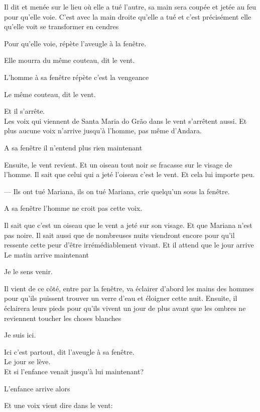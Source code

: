 Il dit et menée sur le lieu où elle a tué l'autre, sa main sera coupée
et jetée au feu pour qu'elle voie. C'est avec la main droite qu'elle a
tué et c'est précisément elle qu'elle voit se transformer en cendres

Pour qu'elle voie, répète l'aveugle à la fenêtre.

Elle mourra du même couteau, dit le vent.

L'homme à sa fenêtre répète c'est la vengeance

Le même couteau, dit le vent.

Et il s'arrête.\\

Les voix qui viennent de Santa Maria do Grão dans le vent s'arrêtent
aussi. Et plus aucune voix n'arrive jusqu'à l'homme, pas même d'Andara.

A sa fenêtre il n'entend plus rien maintenant

Ensuite, le vent revient. Et un oiseau tout noir se fracasse sur le
visage de l'homme. Il sait que celui qui a jeté l'oiseau c'est le vent.
Et cela lui importe peu.

--- Ils ont tué Mariana, ils on tué Mariana, crie quelqu'un sous la
fenêtre.

A sa fenêtre l'homme ne croit pas cette voix.

Il sait que c'est un oiseau que le vent a jeté sur son visage. Et que
Mariana n'est pas noire. Il sait aussi que de nombreuses nuits viendront
encore pour qu'il ressente cette peur d'être irrémédiablement vivant. Et
il attend que le jour arrive\\

Le matin arrive maintenant

Je le sens venir.

Il vient de ce côté, entre par la fenêtre, va éclairer d'abord les mains
des hommes pour qu'ils puissent trouver un verre d'eau et éloigner cette
nuit. Ensuite, il éclairera leurs pieds pour qu'ils vivent un jour de
plus avant que les ombres ne reviennent toucher les choses blanches

Je suis ici.

Ici c'est partout, dit l'aveugle à sa fenêtre.\\

Le jour se lève.\\

Et si l'enfance venait jusqu'à lui maintenant?

L'enfance arrive alors

Et une voix vient dire dans le vent:

